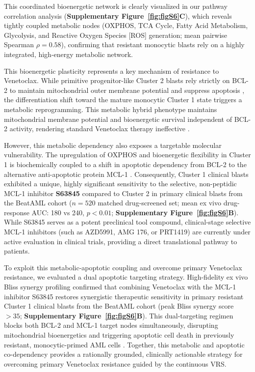 \documentclass[11pt,a4paper]{article}
\begin{document}
This coordinated bioenergetic network is clearly visualized in our pathway correlation analysis (\textbf{Supplementary Figure~\ref{fig:figS6}C}), which reveals tightly coupled metabolic nodes (OXPHOS, TCA Cycle, Fatty Acid Metabolism, Glycolysis, and Reactive Oxygen Species [ROS] generation; mean pairwise Spearman $\rho = 0.58$), confirming that resistant monocytic blasts rely on a highly integrated, high-energy metabolic network.

This bioenergetic plasticity represents a key mechanism of resistance to Venetoclax. While primitive progenitor-like Cluster 2 blasts rely strictly on BCL-2 to maintain mitochondrial outer membrane potential and suppress apoptosis \cite{pan2014bcl2}, the differentiation shift toward the mature monocytic Cluster 1 state triggers a metabolic reprogramming. This metabolic hybrid phenotype maintains mitochondrial membrane potential and bioenergetic survival independent of BCL-2 activity, rendering standard Venetoclax therapy ineffective \cite{lagadinou2013bcl2}.

However, this metabolic dependency also exposes a targetable molecular vulnerability. The upregulation of OXPHOS and bioenergetic flexibility in Cluster 1 is biochemically coupled to a shift in apoptotic dependency from BCL-2 to the alternative anti-apoptotic protein MCL-1 \cite{ramsey2018mcl1}. Consequently, Cluster 1 clinical blasts exhibited a unique, highly significant sensitivity to the selective, non-peptidic MCL-1 inhibitor \textbf{S63845} compared to Cluster 2 in primary clinical blasts from the BeatAML cohort ($n=520$ matched drug-screened set; mean ex vivo drug-response AUC: 180 vs 240, $p < 0.01$; \textbf{Supplementary Figure~\ref{fig:figS6}B}). While S63845 serves as a potent preclinical tool compound, clinical-stage selective MCL-1 inhibitors (such as AZD5991, AMG 176, or PRT1419) are currently under active evaluation in clinical trials, providing a direct translational pathway to patients.

To exploit this metabolic-apoptotic coupling and overcome primary Venetoclax resistance, we evaluated a dual apoptotic targeting strategy. High-fidelity ex vivo Bliss synergy profiling confirmed that combining Venetoclax with the MCL-1 inhibitor S63845 restores synergistic therapeutic sensitivity in primary resistant Cluster 1 clinical blasts from the BeatAML cohort (peak Bliss synergy score $> 35$; \textbf{Supplementary Figure~\ref{fig:figS6}B}). This dual-targeting regimen blocks both BCL-2 and MCL-1 target nodes simultaneously, disrupting mitochondrial bioenergetics and triggering apoptotic cell death in previously resistant, monocytic-primed AML cells \cite{ramsey2018mcl1}. Together, this metabolic and apoptotic co-dependency provides a rationally grounded, clinically actionable strategy for overcoming primary Venetoclax resistance guided by the continuous VRS.
\end{document}
